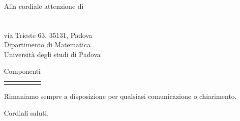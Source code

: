 \documentclass[a4paper]{letter}
\begin{document}
\begin{letter} {Alla cordiale attenzione di \\ \TV \\ \RC \\ via Trieste 63, 35131, Padova\\ Dipartimento di Matematica \\ Università degli studi di Padova }
\begin{longtable}{
			>{\centering}p{}
			>{\centering}p{}
			>{\centering\arraybackslash}p{} }
			\rowcolor{white}\caption {Componenti} \\

		\end{longtable}
	Rimaniamo sempre a disposizione per qualsiasi comunicazione o chiarimento.\\

\closing{
  Cordiali saluti,
}

\end{letter}
\end{document}
